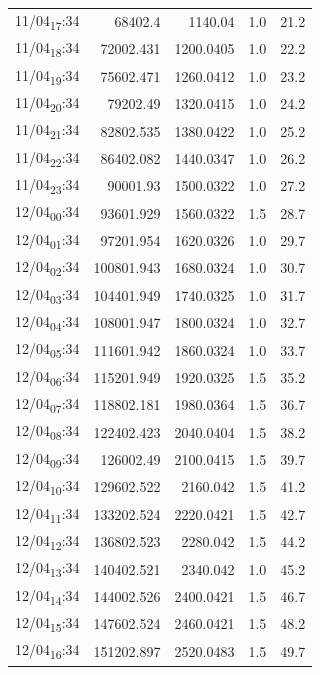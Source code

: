 \documentclass[11pt]{article}
\begin{document}
\begin{center}
\begin{tabular}{lrrrr}
11/04\textsubscript{17}:34 & 68402.4 & 1140.04 & 1.0 & 21.2\\[0pt]
11/04\textsubscript{18}:34 & 72002.431 & 1200.0405 & 1.0 & 22.2\\[0pt]
11/04\textsubscript{19}:34 & 75602.471 & 1260.0412 & 1.0 & 23.2\\[0pt]
11/04\textsubscript{20}:34 & 79202.49 & 1320.0415 & 1.0 & 24.2\\[0pt]
11/04\textsubscript{21}:34 & 82802.535 & 1380.0422 & 1.0 & 25.2\\[0pt]
11/04\textsubscript{22}:34 & 86402.082 & 1440.0347 & 1.0 & 26.2\\[0pt]
11/04\textsubscript{23}:34 & 90001.93 & 1500.0322 & 1.0 & 27.2\\[0pt]
12/04\textsubscript{00}:34 & 93601.929 & 1560.0322 & 1.5 & 28.7\\[0pt]
12/04\textsubscript{01}:34 & 97201.954 & 1620.0326 & 1.0 & 29.7\\[0pt]
12/04\textsubscript{02}:34 & 100801.943 & 1680.0324 & 1.0 & 30.7\\[0pt]
12/04\textsubscript{03}:34 & 104401.949 & 1740.0325 & 1.0 & 31.7\\[0pt]
12/04\textsubscript{04}:34 & 108001.947 & 1800.0324 & 1.0 & 32.7\\[0pt]
12/04\textsubscript{05}:34 & 111601.942 & 1860.0324 & 1.0 & 33.7\\[0pt]
12/04\textsubscript{06}:34 & 115201.949 & 1920.0325 & 1.5 & 35.2\\[0pt]
12/04\textsubscript{07}:34 & 118802.181 & 1980.0364 & 1.5 & 36.7\\[0pt]
12/04\textsubscript{08}:34 & 122402.423 & 2040.0404 & 1.5 & 38.2\\[0pt]
12/04\textsubscript{09}:34 & 126002.49 & 2100.0415 & 1.5 & 39.7\\[0pt]
12/04\textsubscript{10}:34 & 129602.522 & 2160.042 & 1.5 & 41.2\\[0pt]
12/04\textsubscript{11}:34 & 133202.524 & 2220.0421 & 1.5 & 42.7\\[0pt]
12/04\textsubscript{12}:34 & 136802.523 & 2280.042 & 1.5 & 44.2\\[0pt]
12/04\textsubscript{13}:34 & 140402.521 & 2340.042 & 1.0 & 45.2\\[0pt]
12/04\textsubscript{14}:34 & 144002.526 & 2400.0421 & 1.5 & 46.7\\[0pt]
12/04\textsubscript{15}:34 & 147602.524 & 2460.0421 & 1.5 & 48.2\\[0pt]
12/04\textsubscript{16}:34 & 151202.897 & 2520.0483 & 1.5 & 49.7\\[0pt]

\end{tabular}
\end{center}
\end{document}
